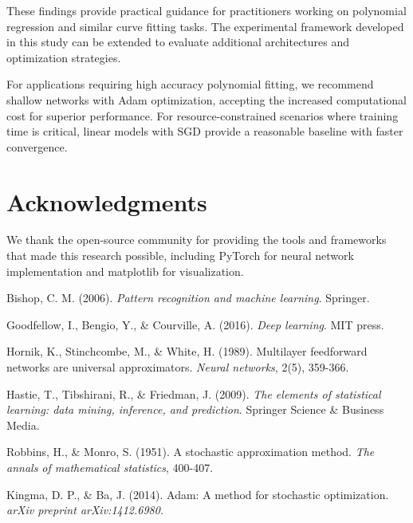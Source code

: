 \documentclass[11pt,twocolumn]{article}
\begin{document}
These findings provide practical guidance for practitioners working on polynomial regression and similar curve fitting tasks. The experimental framework developed in this study can be extended to evaluate additional architectures and optimization strategies.

For applications requiring high accuracy polynomial fitting, we recommend shallow networks with Adam optimization, accepting the increased computational cost for superior performance. For resource-constrained scenarios where training time is critical, linear models with SGD provide a reasonable baseline with faster convergence.

\section{Acknowledgments}

We thank the open-source community for providing the tools and frameworks that made this research possible, including PyTorch for neural network implementation and matplotlib for visualization.


\begin{thebibliography}{9}

Bishop, C. M. (2006). 
\textit{Pattern recognition and machine learning}. 
Springer.

Goodfellow, I., Bengio, Y., \& Courville, A. (2016). 
\textit{Deep learning}. 
MIT press.

Hornik, K., Stinchcombe, M., \& White, H. (1989). 
Multilayer feedforward networks are universal approximators. 
\textit{Neural networks}, 2(5), 359-366.

Hastie, T., Tibshirani, R., \& Friedman, J. (2009). 
\textit{The elements of statistical learning: data mining, inference, and prediction}. 
Springer Science \& Business Media.

Robbins, H., \& Monro, S. (1951). 
A stochastic approximation method. 
\textit{The annals of mathematical statistics}, 400-407.

Kingma, D. P., \& Ba, J. (2014). 
Adam: A method for stochastic optimization. 
\textit{arXiv preprint arXiv:1412.6980}.

\end{thebibliography}
\end{document}
